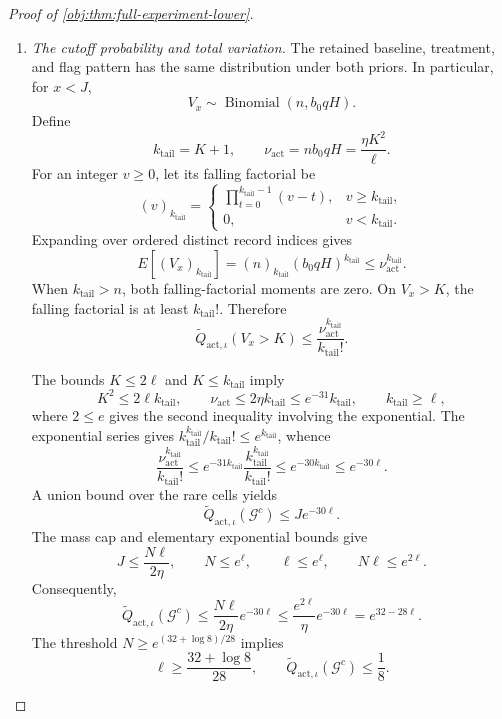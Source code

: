 \documentclass[11pt]{article}
\begin{document}
\begin{proof}[Proof of \cref{obj:thm:full-experiment-lower}]
\begin{enumerate}
\item \emph{The cutoff probability and total variation.}
The retained baseline, treatment, and flag pattern has the same distribution
under both priors. In particular, for \(x<J\),
\[
V_x\sim\operatorname{Binomial}(n,b_0qH).
\]
Define
\[
k_{\mathrm{tail}}=K+1,\qquad
\nu_{\mathrm{act}}=nb_0qH=\frac{\eta K^2}{\ell}.
\]
For an integer \(v\ge0\), let its falling factorial be
\[
(v)_{k_{\mathrm{tail}}}
=
\begin{cases}
\displaystyle\prod_{t=0}^{k_{\mathrm{tail}}-1}(v-t),
&v\ge k_{\mathrm{tail}},\\
0,&v<k_{\mathrm{tail}}.
\end{cases}
\]
Expanding over ordered distinct record indices gives
\[
E[(V_x)_{k_{\mathrm{tail}}}]
=(n)_{k_{\mathrm{tail}}}(b_0qH)^{k_{\mathrm{tail}}}
\le\nu_{\mathrm{act}}^{k_{\mathrm{tail}}}.
\]
When \(k_{\mathrm{tail}}>n\), both falling-factorial moments are zero.
On \(V_x>K\), the falling factorial is at least \(k_{\mathrm{tail}}!\).
Therefore
\[
\widetilde Q_{\mathrm{act},\iota}(V_x>K)
\le
\frac{\nu_{\mathrm{act}}^{k_{\mathrm{tail}}}}
{k_{\mathrm{tail}}!}.
\]

The bounds \(K\le2\ell\) and \(K\le k_{\mathrm{tail}}\) imply
\[
K^2\le2\ell k_{\mathrm{tail}},
\qquad
\nu_{\mathrm{act}}\le2\eta k_{\mathrm{tail}}
\le e^{-31}k_{\mathrm{tail}},
\qquad
k_{\mathrm{tail}}\ge\ell,
\]
where \(2\le e\) gives the second inequality involving the exponential.
The exponential series gives
\(k_{\mathrm{tail}}^{k_{\mathrm{tail}}}/k_{\mathrm{tail}}!
\le e^{k_{\mathrm{tail}}}\), whence
\[
\frac{\nu_{\mathrm{act}}^{k_{\mathrm{tail}}}}
{k_{\mathrm{tail}}!}
\le
e^{-31k_{\mathrm{tail}}}
\frac{k_{\mathrm{tail}}^{k_{\mathrm{tail}}}}
{k_{\mathrm{tail}}!}
\le e^{-30k_{\mathrm{tail}}}
\le e^{-30\ell}.
\]
A union bound over the rare cells yields
\[
\widetilde Q_{\mathrm{act},\iota}(\mathcal G^c)
\le Je^{-30\ell}.
\]
The mass cap and elementary exponential bounds give
\[
J\le\frac{N\ell}{2\eta},\qquad
N\le e^\ell,\qquad \ell\le e^\ell,\qquad
N\ell\le e^{2\ell}.
\]
Consequently,
\[
\widetilde Q_{\mathrm{act},\iota}(\mathcal G^c)
\le
\frac{N\ell}{2\eta}e^{-30\ell}
\le
\frac{e^{2\ell}}{\eta}e^{-30\ell}
=e^{32-28\ell}.
\]
The threshold \(N\ge e^{(32+\log8)/28}\) implies
\[
\ell\ge\frac{32+\log8}{28},
\qquad
\widetilde Q_{\mathrm{act},\iota}(\mathcal G^c)\le\frac18.
\]


\end{enumerate}
\end{proof}
\end{document}
